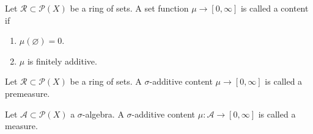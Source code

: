 \begin{definition}[Content]
    Let \(\mathcal{R} \subset \mathcal{P}(X)\) be a ring of sets. A set function \(\mu \rightarrow [0, \infty]\) is called a content if
    \begin{enumerate}
        \item \(\mu(\varnothing) = 0\).
        \item \(\mu\) is finitely additive.
    \end{enumerate}
\end{definition}
%
\begin{definition}[Premeasure]
    Let \(\mathcal{R} \subset \mathcal{P}(X)\) be a ring of sets. A \(\sigma\)-additive content \(\mu \rightarrow [0, \infty]\) is called a premeasure.
\end{definition}
%
\begin{definition}[Measure]
    Let \(\mathcal{A} \subset \mathcal{P}(X)\) a \(\sigma\)-algebra. A \(\sigma\)-additive content \(\mu: \mathcal{A} \rightarrow [0, \infty]\) is called a measure.
\end{definition}